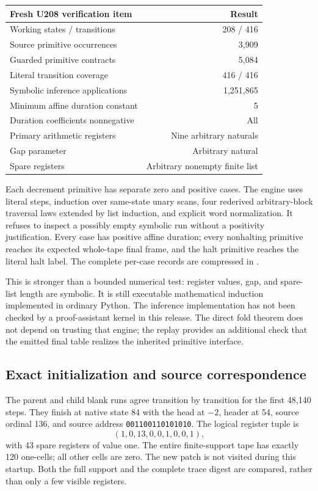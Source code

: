\documentclass[11pt,letterpaper]{article}
\begin{document}
\begin{center}
\begin{tabular}{@{}lr@{}}
\toprule
Fresh U208 verification item & Result\\
\midrule
Working states / transitions & 208 / 416\\
Source primitive occurrences & 3,909\\
Guarded primitive contracts & 5,084\\
Literal transition coverage & 416 / 416\\
Symbolic inference applications & 1,251,865\\
Minimum affine duration constant & 5\\
Duration coefficients nonnegative & All\\
Primary arithmetic registers & Nine arbitrary naturals\\
Gap parameter & Arbitrary natural\\
Spare registers & Arbitrary nonempty finite list\\
\bottomrule
\end{tabular}
\end{center}

Each decrement primitive has separate zero and positive cases. The engine
uses literal steps, induction over same-state unary scans, four rederived
arbitrary-block traversal laws extended by list induction, and explicit
word normalization. It refuses to inspect a possibly empty symbolic run
without a positivity justification. Every case has positive affine duration;
every nonhalting primitive reaches its expected whole-tape final frame, and
the halt primitive reaches the literal halt label. The complete per-case
records are compressed in .

This is stronger than a bounded numerical test: register values, gap, and
spare-list length are symbolic. It is still executable mathematical
induction implemented in ordinary Python. The inference implementation has
not been checked by a proof-assistant kernel in this release. The direct
fold theorem does not depend on trusting that engine; the replay provides
an additional check that the emitted final table realizes the inherited
primitive interface.

\subsection{Exact initialization and source correspondence}

The parent and child blank runs agree transition by transition for the first
48,140 steps. They finish at native state 84 with the head at $-2$, header
at 54, source ordinal 136, and source address
\texttt{001100110101010}. The logical register tuple is
\[
 (1,0,13,0,0,1,0,0,1),
\]
with 43 spare registers of value one. The entire finite-support tape has
exactly 120 one-cells; all other cells are zero. The new patch is not visited
during this startup. Both the full support and the complete trace digest
are compared, rather than only a few visible registers.
\end{document}
